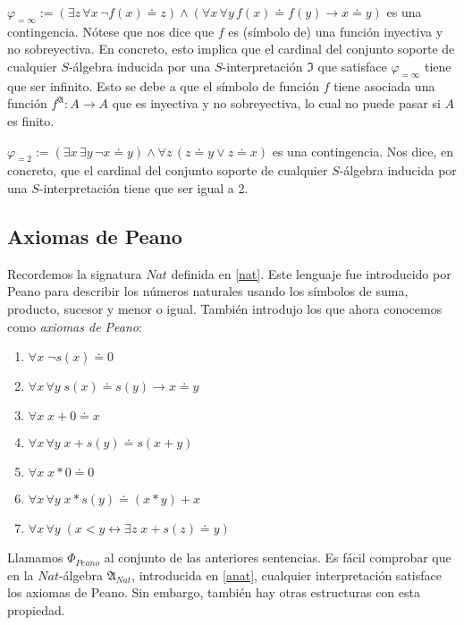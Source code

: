 \begin{example}
$\varphi_{=\infty} := (\exists z \, \forall x \, \neg f(x) \doteq z) \land (\forall x \, \forall y \, f(x) \doteq f(y) \rightarrow x \doteq y)$ es una contingencia. Nótese que nos dice que $f$ es (símbolo de) una función inyectiva y no sobreyectiva. En concreto, esto implica que el cardinal del conjunto soporte de cualquier $S$-álgebra inducida por una $S$-interpretación $\mathfrak{I}$ que satisface $\varphi_{=\infty}$ tiene que ser infinito. Esto se debe a que el símbolo de función $f$ tiene asociada una función $f^\mathfrak{A}:A\to A$ que es inyectiva y no sobreyectiva, lo cual no puede pasar si $A$ es finito.
\end{example}

\begin{example}
$\varphi_{=2} := (\exists x \, \exists y \, \neg x \doteq y) \land \forall z \, (z \doteq y \lor z \doteq x)$ es una contingencia. Nos dice, en concreto, que el cardinal del conjunto soporte de cualquier $S$-álgebra inducida por una $S$-interpretación tiene que ser igual a 2.
\end{example}


\subsection{Axiomas de Peano}
Recordemos la signatura $Nat$ definida en \ref{nat}. Este lenguaje fue introducido por Peano para describir los números naturales usando los símbolos de suma, producto, sucesor y menor o igual. También introdujo los que ahora conocemos como \textit{axiomas de Peano}:
\begin{enumerate}
    \item $\forall x \; \neg s(x)\doteq 0$
    \item $\forall x \, \forall y \; s(x)\doteq s(y)\to x\doteq y$
    \item $\forall x \; x+0\doteq x$
    \item $\forall x \, \forall y \; x+s(y)\doteq s(x+y)$
    \item $\forall x \; x*0\doteq 0$
    \item $\forall x \, \forall y \; x*s(y)\doteq (x*y)+x$
    \item $\forall x \, \forall y \; (x<y \leftrightarrow \exists z \; x+s(z)\doteq y)$
\end{enumerate}
Llamamos $\Phi_{Peano}$ al conjunto de las anteriores sentencias.
Es fácil comprobar que en la $Nat$-álgebra $\mathfrak{A}_{Nat}$, introducida en \ref{anat}, cualquier interpretación satisface los axiomas de Peano. Sin embargo, también hay otras estructuras con esta propiedad.

